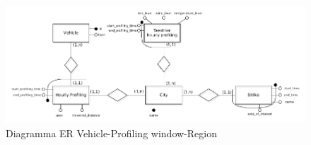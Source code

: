 \begin{figure}[H]                                                                                                                                                            
\centering                                                                                                                                                                   
\includegraphics[width=\textwidth]{diagrams/integrated_1_er}                                                                                                                                   
\caption{Diagramma ER Vehicle-Profiling window-Region}                                                                                                                                            
\label{fig:integrated_1_er}                                                                                                                                                           
\end{figure}


